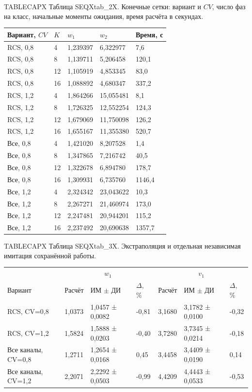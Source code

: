 \noindent TABLECAPX Таблица SEQXtab_2X. Конечные сетки: вариант и \(CV\), число фаз на класс, начальные моменты ожидания, время расчёта в секундах.\par

\setlength{\tabcolsep}{2pt}
\begin{tabular}{p{4.44cm}p{1.13cm}p{3.31cm}p{3.31cm}p{2.46cm}}
\toprule
Вариант, $CV$ & $K$ & $w_1$ & $w_2$ & Время, с \\
\midrule
RCS, 0,8 & 4 & 1,239397 & 6,322977 & 7,6 \\
RCS, 0,8 & 8 & 1,139711 & 5,206458 & 120,1 \\
RCS, 0,8 & 12 & 1,105919 & 4,853345 & 83,0 \\
RCS, 0,8 & 16 & 1,088892 & 4,680347 & 337,2 \\
RCS, 1,2 & 4 & 1,864266 & 15,055481 & 8,1 \\
RCS, 1,2 & 8 & 1,726325 & 12,552254 & 124,3 \\
RCS, 1,2 & 12 & 1,679069 & 11,750098 & 126,2 \\
RCS, 1,2 & 16 & 1,655167 & 11,355380 & 520,7 \\
Все, 0,8 & 4 & 1,421020 & 8,207528 & 1,4 \\
Все, 0,8 & 8 & 1,347865 & 7,216742 & 40,5 \\
Все, 0,8 & 12 & 1,322678 & 6,894780 & 178,7 \\
Все, 0,8 & 16 & 1,309931 & 6,735760 & 1146,4 \\
Все, 1,2 & 4 & 2,324342 & 23,043622 & 10,3 \\
Все, 1,2 & 8 & 2,267271 & 21,460974 & 173,0 \\
Все, 1,2 & 12 & 2,247481 & 20,944201 & 115,2 \\
Все, 1,2 & 16 & 2,237492 & 20,690638 & 1357,7 \\
\bottomrule
\end{tabular}




\noindent TABLECAPX Таблица SEQXtab_3X. Экстраполяция и отдельная независимая имитация сохранённой работы.\par

\setlength{\tabcolsep}{2pt}
\begin{tabular}{p{4.16cm}p{1.61cm}p{2.83cm}p{1.28cm}p{1.61cm}p{2.83cm}p{1.28cm}}
\toprule
 & \multicolumn{3}{c}{$w_1$} & \multicolumn{3}{c}{$v_1$} \\
Вариант & Расчёт & ИМ $\pm$ ДИ & $\Delta$, \% & Расчёт & ИМ $\pm$ ДИ & $\Delta$, \% \\
\midrule
RCS, CV=0,8 & 1,0373 & 1,0457 ± 0,0082 & -0,81 & 3,1680 & 3,1782 ± 0,0100 & -0,32 \\
RCS, CV=1,2 & 1,5824 & 1,5888 ± 0,0203 & -0,40 & 3,7280 & 3,7345 ± 0,0214 & -0,18 \\
Все каналы, CV=0,8 & 1,2711 & 1,2654 ± 0,0168 & 0,45 & 3,4458 & 3,4409 ± 0,0190 & 0,14 \\
Все каналы, CV=1,2 & 2,2071 & 2,2292 ± 0,0503 & -0,99 & 4,4209 & 4,4443 ± 0,0533 & -0,53 \\
\bottomrule
\end{tabular}




